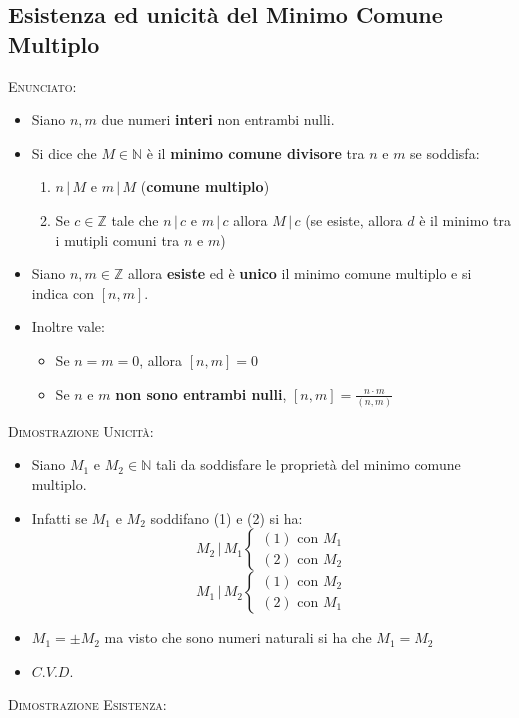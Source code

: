 \documentclass[10pt]{article}
\begin{document}
\subsection{Esistenza ed unicità del Minimo Comune Multiplo}
\textsc{Enunciato:}
\begin{itemize}
\item
Siano $n,m$ due numeri \textbf{interi} non entrambi nulli. 
\item
Si dice che $M \in \mathbb{N}$ è il \textbf{minimo comune divisore} tra $n$ e $m$ se soddisfa:
\begin{enumerate}
\item
$n \,|\, M$ e $m \,|\, M$ (\textbf{comune multiplo})
\item
Se $c \in \mathbb{Z}$ tale che $n \,|\, c$ e $m \,|\, c$ allora $M \,|\, c$ (se esiste, allora $d$ è il minimo tra i mutipli comuni tra $n$ e $m$)
\end{enumerate}
\item
Siano $n,m \in \mathbb{Z}$ allora \textbf{esiste} ed è \textbf{unico} il minimo comune multiplo e si indica con $\left[n,m\right]$.
\item
Inoltre vale:
\begin{itemize}
\item
Se $n = m = 0$, allora $\left[n,m\right] = 0$
\item
Se $n$ e $m$ \textbf{non sono entrambi nulli}, $\left[n,m\right] = \displaystyle{\frac{n \cdot m}{(n,m)}}$
\end{itemize}
\end{itemize}
\textsc{Dimostrazione Unicità:}
\begin{itemize}
\item
Siano $M_1$ e $M_2 \in \mathbb{N}$ tali da soddisfare le proprietà del minimo comune multiplo.
\item
Infatti se $M_1$ e $M_2$ soddifano (1) e (2) si ha:
\[
M_2 \,|\, M_1
\begin{cases}
(1) \textrm{ con } M_1 \\
(2) \textrm{ con } M_2
\end{cases}
\]
\[
M_1 \,|\, M_2
\begin{cases}
(1) \textrm{ con } M_2\\
(2) \textrm{ con } M_1
\end{cases}
\]
\item
$M_1=\pm M_2$ ma visto che sono numeri naturali si ha che $M_1= M_2$
\item
$C.V.D.$
\end{itemize}
\textsc{Dimostrazione Esistenza:}
\end{document}
